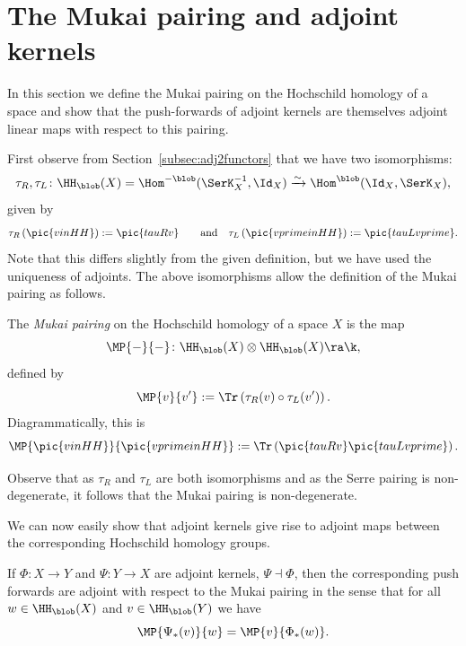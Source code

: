\section{The Mukai pairing and adjoint kernels}
\label{sec:adjoint}

In this section we define the Mukai pairing on the Hochschild homology
of a space and show that the push-forwards of adjoint kernels are
themselves adjoint linear maps with respect to this pairing.

First observe from Section~\ref{subsec:adj2functors} that we have two
isomorphisms:
\[\tau_R,\tau_L\colon\HH_\blob(X) = \Hom^{-\blob}(\SerK_X^{-1}, \Id_X) \xrightarrow{\sim}\Hom^\blob(\Id_X, \SerK_X),\] 
given by
\[\tau_R\left(\pic{vinHH}\right):=\pic{tauRv}\qquad\text{and} \quad
\tau_L\left(\pic{vprimeinHH}\right):=\pic{tauLvprime}.\]
Note that this differs slightly from the given definition, but we have used the uniqueness of adjoints.  The above isomorphisms allow the definition of the Mukai pairing as
follows.

\begin{Definition} %
  The \emph{Mukai pairing} on the Hochschild homology of a space $X$ is the
  map
  \[ \MP{{-}}{{-}} \colon \HH_\blob(X) \otimes \HH_\blob(X) \ra \k, \]
  defined by
  \[ \MP{v}{v'}:= \Tr\left(\tau_R(v) \circ \tau_L(v')\right). \]
  Diagrammatically, this is
  \[\MP{\pic{vinHH}}{\pic{vprimeinHH}}:=
  \Tr\left(\pic{tauRv}\pic{tauLvprime}\right).\]
\end{Definition}
\medskip

\noindent
Observe that as $\tau_R$ and $\tau_L$ are both isomorphisms and as the
Serre pairing is non-degenerate, it follows that the Mukai pairing is
non-degenerate.

We can now easily show that adjoint kernels give rise to adjoint maps
between the corresponding Hoch\-schild homology groups.

\begin{Theorem}[Adjointness]
\label{thm:adjointness}
  If $\Phi\colon X\to Y$ and $\Psi\colon Y\to X$ are adjoint kernels,
  $\Psi\dashv\Phi$, then the corresponding push forwards are adjoint
  with respect to the Mukai pairing in the sense that for all $w\in
  \HH_\blob(X)$ and $v\in \HH_\blob(Y)$ we have
  \[\MP{\Psi_*(v)}{w}=\MP{v}{\Phi_*(w)}.\]
\end{Theorem}

